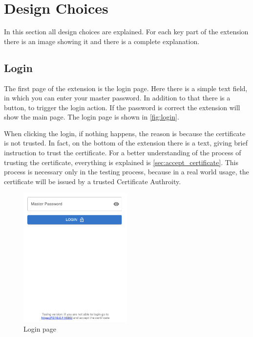 \section {Design Choices}

In this section all design choices are explained. For each key part of the extension there is an image showing it and there is a complete explanation.

\subsection{Login}

The first page of the extension is the login page. Here there is a simple text field, in which you can enter your master password. In addition to that there is a button, to trigger the login action. If the password is correct the extension will show the main page.
The login page is shown in \autoref{fig:login}.

When clicking the login, if nothing happens, the reason is because the certificate is not trusted. In fact, on the bottom of the extension there is a text, giving brief instruction to trust the certificate. 
For a better understanding of the process of trusting the certificate, everything is explained is \autoref{sec:accept_certificate}.
This process is necessary only in the testing process, because in a real world usage, the certificate will be issued by a trusted Certificate Authroity.


\begin{figure}[h!]
    \centering
    \vspace{0.5cm}
    \includegraphics[width=0.5\textwidth]{images/extension/login.png}
    \caption{Login page}
    \label{fig:login} %
\end{figure}


